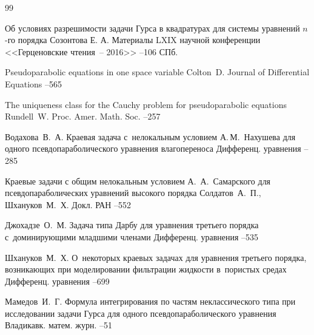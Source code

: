 \begin{thebibliography}{99}


\paper Об условиях разрешимости задачи Гурса в квадратурах для системы уравнений $n$-го порядка
\by  Созонтова Е. А.
\inbook Материалы LXIX  научной конференции <<Герценовские чтения~-- 2016>>
--106
\publaddr СПб.


\paper    Pseudoparabolic equations in one space variable 
\by  Colton~D.
\jour Journal of Differential Equations
--565


\paper  The uniqueness class for the Cauchy problem for pseudoparabolic equations
\by   Rundell~W.
\jour Proc. Amer. Math. Soc. 
--257


\by  Водахова~В.~А.
\paper Краевая задача с~нелокальным условием А.\,М.~Нахушева для одного псевдопараболического уравнения влагопереноса
\jour Дифференц. уравнения
--285


\paper Краевые задачи с общим нелокальным условием А.~А.~Самарского для псевдопараболических уравнений высокого порядка
\by Солдатов~А.~П., Шхануков~М.~Х.
\jour Докл. РАН
--552

\by  Джохадзе~О.~М.
\paper Задача типа Дарбу для уравнения третьего порядка с~доминирующими младшими членами
\jour Дифференц. уравнения
--535

\by  Шхануков~М.~Х.
\paper О~некоторых краевых задачах для уравнения третьего порядка, возникающих при моделировании 
фильтрации жидкости в~пористых средах
\jour Дифференц. уравнения
--699

\by  Мамедов~И.~Г.
\paper Формула интегрирования по частям неклассического типа при исследовании задачи Гурса для одного псевдопараболического уравнения
\jour Владикавк. матем. журн.
--51


\end{thebibliography}
